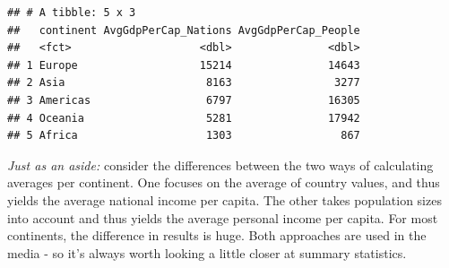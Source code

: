 \documentclass[
]{book}
\newenvironment{Shaded}{\begin{snugshade}}{\end{snugshade}}
\newcommand{\CommentTok}[1]{\textcolor[rgb]{0.56,0.35,0.01}{\textit{#1}}}
\newcommand{\DataTypeTok}[1]{\textcolor[rgb]{0.13,0.29,0.53}{#1}}
\newcommand{\DecValTok}[1]{\textcolor[rgb]{0.00,0.00,0.81}{#1}}
\newcommand{\KeywordTok}[1]{\textcolor[rgb]{0.13,0.29,0.53}{\textbf{#1}}}
\newcommand{\NormalTok}[1]{#1}
\newcommand{\OperatorTok}[1]{\textcolor[rgb]{0.81,0.36,0.00}{\textbf{#1}}}
\newcommand{\StringTok}[1]{\textcolor[rgb]{0.31,0.60,0.02}{#1}}
\begin{document}
\begin{Shaded}
\end{Shaded}

\begin{verbatim}
## # A tibble: 5 x 3
##   continent AvgGdpPerCap_Nations AvgGdpPerCap_People
##   <fct>                    <dbl>               <dbl>
## 1 Europe                   15214               14643
## 2 Asia                      8163                3277
## 3 Americas                  6797               16305
## 4 Oceania                   5281               17942
## 5 Africa                    1303                 867
\end{verbatim}

\emph{Just as an aside:} consider the differences between the two ways of calculating averages per continent. One focuses on the average of country values, and thus yields the average national income per capita. The other takes population sizes into account and thus yields the average personal income per capita. For most continents, the difference in results is huge. Both approaches are used in the media - so it's always worth looking a little closer at summary statistics.
\end{document}
